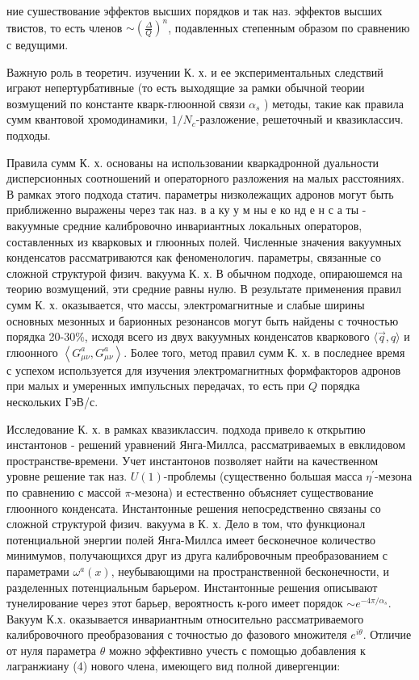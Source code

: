 \documentclass[10pt]{article}
\begin{document}
ние сушествование эффектов высших порядков и так наз. эффектов высших твистов, то есть членов $\sim\left(\frac{\Delta}{Q}\right)^{n}$, подавленных степенным образом по сравнению с ведущими.



Важную роль в теоретич. изучении К. х. и ее экспериментальных следствий играют непертурбативные (то есть выходящие за рамки обычной теории возмущений по константе кварк-глюонной связи $\alpha_{s}$ ) методы, такие как правила сумм квантовой хромодинамики, $1 / N_{c}$-разложение, решеточный и квазиклассич. подходы.



Правила сумм К. х. основаны на использовании кваркадронной дуальности дисперсионных соотношений и операторного разложения на малых расстояниях. В рамках этого подхода статич. параметры низколежащих адронов могут быть приближенно выражены через так наз. в а ку у м ны е ко нд е н с а ты - вакуумные средние калибровочно инвариантных локальных операторов, составленных из кварковых и глюонных полей. Численные значения вакуумных конденсатов рассматриваются как феноменологич. параметры, связанные со сложной структурой физич. вакуума К. х. В обычном подходе, опираюшемся на теорию возмущений, эти средние равны нулю. В результате применения правил сумм К. х. оказывается, что массы, электромагнитные и слабые ширины основных мезонных и барионных резонансов могут быть найдены с точностью порядка 20-30\%, исходя всего из двух вакуумных конденсатов кваркового $\langle\vec{q}, q\rangle$ и глюонного $\left\langle G_{\mu \nu}^{a}, G_{\mu \nu}^{a}\right\rangle$. Более того, метод правил сумм К. х. в последнее время с успехом используется для изучения электромагнитных формфакторов адронов при малых и умеренных импульсных передачах, то есть при $Q$ порядка нескольких ГэВ/с.



Исследование К. х. в рамках квазиклассич. подхода привело к открытию инстантонов - решений уравнений Янга-Миллса, рассматриваемых в евклидовом пространстве-времени. Учет инстантонов позволяет найти на качественном уровне решение так наз. $U(1)$-проблемы (существенно большая масса $\eta^{\prime}$-мезона по сравнению с массой $\pi$-мезона) и естественно объясняет существование глюонного конденсата. Инстантонные решения непосредственно связаны со сложной структурой физич. вакуума в К. х. Дело в том, что функционал потенциальной энергии полей Янга-Миллса имеет бесконечное количество минимумов, получающихся друг из друга калибровочным преобразованием с параметрами $\omega^{a}(x)$, неубывающими на пространственной бесконечности, и разделенных потенциальным барьером. Инстантонные решения описывают тунелирование через этот барьер, вероятность к-рого имеет порядок $\sim e^{-4 \pi / \alpha_{s}}$. Вакуум К.х. оказывается инвариантным относительно рассматриваемого калибровочного преобразования с точностью до фазового множителя $e^{i \theta}$. Отличие от нуля параметра $\theta$ можно эффективно учесть с помощью добавления к лагранжиану (4) нового члена, имеющего вид полной дивергенции:
\end{document}
